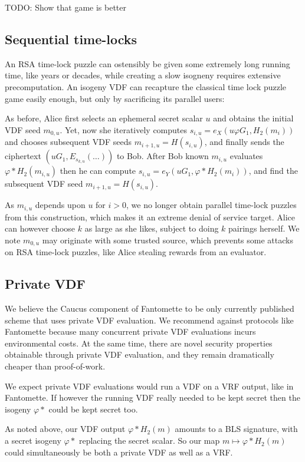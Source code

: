\documentclass{article}
\begin{document}
TODO: Show that game is better

\subsection{Sequential time-locks}

An RSA time-lock puzzle can ostensibly be given some extremely long
running time, like years or decades, while creating a slow isogneny
requires extensive precomputation.  An isogeny VDF can recapture the
classical time lock puzzle game easily enough, but only by sacrificing
its parallel users:

As before, Alice first selects an ephemeral secret scalar $u$ and
obtains the initial VDF seed $m_{0,u}$.  Yet, now she iteratively
computes $s_{i,u} = e_X ( u φ G_1, H_2(m_i) )$ and chooses subsequent
VDF seeds $m_{i+1,u} = H(s_{i,u})$, and finally sends the ciphertext
$(u G_1, E_{s_{k,u}}(\ldots))$ to Bob.
After Bob known $m_{i,u}$ evaluates $φ* H_2(m_{i,u})$ then he can
compute $s_{i,u} = e_Y ( u G_1, φ* H_2(m_i) )$, and find the subsequent
VDF seed $m_{i+1,u} = H(s_{i,u})$.

As $m_{i,u}$ depends upon $u$ for $i>0$, we no longer obtain parallel
time-lock puzzles from this construction, which makes it an extreme
denial of service target.  Alice can however choose $k$ as large as
she likes, subject to doing $k$ pairings herself.
We note $m_{0,u}$ may originate with some trusted source, which
prevents some attacks on RSA time-lock puzzles, like Alice stealing
rewards from an evaluator.

\subsection{Private VDF}

We believe the Caucus component of Fantomette \cite[\S5]{Fantomette}
to be only currently published scheme that uses private VDF evaluation.
We recommend against protocols like Fantomette because many concurrent
private VDF evaluations incurs environmental costs.  At the same time,
there are novel security properties obtainable through private VDF
evaluation, and they remain dramatically cheaper than proof-of-work.

We expect private VDF evaluations would run a VDF on a VRF output,
like in Fantomette.  If however the running VDF really needed to
be kept secret then the isogeny $φ*$ could be kept secret too.

As noted above, our VDF output $φ* H_2(m)$ amounts to a BLS signature,
with a secret isogeny $φ*$ replacing the secret scalar.  So our map
$m \mapsto φ* H_2(m)$ could simultaneously be both a private VDF as
well as a VRF.  
\end{document}
